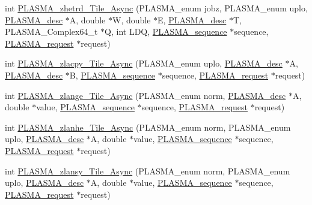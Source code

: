 \begin{DoxyCompactItemize}
\item 
int \hyperlink{group__PLASMA__Complex64__t__Tile__Async_ga857cb7f326bb74e4a282c99bb2d9b557_ga857cb7f326bb74e4a282c99bb2d9b557}{P\+L\+A\+S\+M\+A\+\_\+zhetrd\+\_\+\+Tile\+\_\+\+Async} (P\+L\+A\+S\+M\+A\+\_\+enum jobz, P\+L\+A\+S\+M\+A\+\_\+enum uplo, \hyperlink{structplasma__desc__t}{P\+L\+A\+S\+M\+A\+\_\+desc} $\ast$A, double $\ast$W, double $\ast$E, \hyperlink{structplasma__desc__t}{P\+L\+A\+S\+M\+A\+\_\+desc} $\ast$T, P\+L\+A\+S\+M\+A\+\_\+\+Complex64\+\_\+t $\ast$Q, int L\+D\+Q, \hyperlink{structplasma__sequence__t}{P\+L\+A\+S\+M\+A\+\_\+sequence} $\ast$sequence, \hyperlink{structplasma__request__t}{P\+L\+A\+S\+M\+A\+\_\+request} $\ast$request)
\item 
int \hyperlink{group__PLASMA__Complex64__t__Tile__Async_gae38a72f65089e76fd46a2e978b46565f_gae38a72f65089e76fd46a2e978b46565f}{P\+L\+A\+S\+M\+A\+\_\+zlacpy\+\_\+\+Tile\+\_\+\+Async} (P\+L\+A\+S\+M\+A\+\_\+enum uplo, \hyperlink{structplasma__desc__t}{P\+L\+A\+S\+M\+A\+\_\+desc} $\ast$A, \hyperlink{structplasma__desc__t}{P\+L\+A\+S\+M\+A\+\_\+desc} $\ast$B, \hyperlink{structplasma__sequence__t}{P\+L\+A\+S\+M\+A\+\_\+sequence} $\ast$sequence, \hyperlink{structplasma__request__t}{P\+L\+A\+S\+M\+A\+\_\+request} $\ast$request)
\item 
int \hyperlink{group__PLASMA__Complex64__t__Tile__Async_ga766f2461e8a4262181569265fb3648d7_ga766f2461e8a4262181569265fb3648d7}{P\+L\+A\+S\+M\+A\+\_\+zlange\+\_\+\+Tile\+\_\+\+Async} (P\+L\+A\+S\+M\+A\+\_\+enum norm, \hyperlink{structplasma__desc__t}{P\+L\+A\+S\+M\+A\+\_\+desc} $\ast$A, double $\ast$value, \hyperlink{structplasma__sequence__t}{P\+L\+A\+S\+M\+A\+\_\+sequence} $\ast$sequence, \hyperlink{structplasma__request__t}{P\+L\+A\+S\+M\+A\+\_\+request} $\ast$request)
\item 
int \hyperlink{group__PLASMA__Complex64__t__Tile__Async_ga72d33c6f54cecf6c7afc07e4c8649586_ga72d33c6f54cecf6c7afc07e4c8649586}{P\+L\+A\+S\+M\+A\+\_\+zlanhe\+\_\+\+Tile\+\_\+\+Async} (P\+L\+A\+S\+M\+A\+\_\+enum norm, P\+L\+A\+S\+M\+A\+\_\+enum uplo, \hyperlink{structplasma__desc__t}{P\+L\+A\+S\+M\+A\+\_\+desc} $\ast$A, double $\ast$value, \hyperlink{structplasma__sequence__t}{P\+L\+A\+S\+M\+A\+\_\+sequence} $\ast$sequence, \hyperlink{structplasma__request__t}{P\+L\+A\+S\+M\+A\+\_\+request} $\ast$request)
\item 
int \hyperlink{group__PLASMA__Complex64__t__Tile__Async_gae68fa85784fc38045ed2723686275b01_gae68fa85784fc38045ed2723686275b01}{P\+L\+A\+S\+M\+A\+\_\+zlansy\+\_\+\+Tile\+\_\+\+Async} (P\+L\+A\+S\+M\+A\+\_\+enum norm, P\+L\+A\+S\+M\+A\+\_\+enum uplo, \hyperlink{structplasma__desc__t}{P\+L\+A\+S\+M\+A\+\_\+desc} $\ast$A, double $\ast$value, \hyperlink{structplasma__sequence__t}{P\+L\+A\+S\+M\+A\+\_\+sequence} $\ast$sequence, \hyperlink{structplasma__request__t}{P\+L\+A\+S\+M\+A\+\_\+request} $\ast$request)

\end{DoxyCompactItemize}
